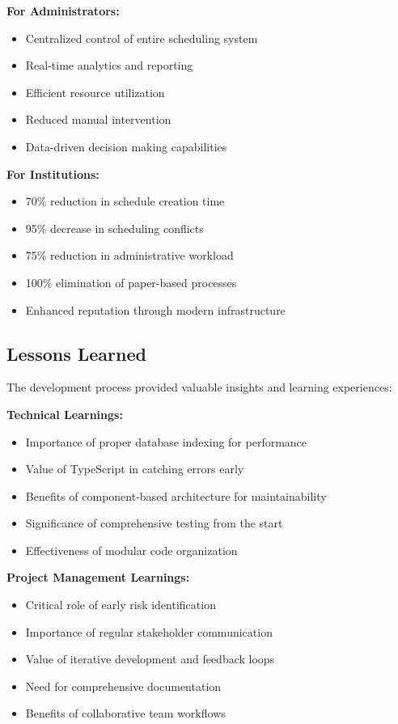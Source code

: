 \textbf{For Administrators:}
\begin{itemize}
    \item Centralized control of entire scheduling system
    \item Real-time analytics and reporting
    \item Efficient resource utilization
    \item Reduced manual intervention
    \item Data-driven decision making capabilities
\end{itemize}

\textbf{For Institutions:}
\begin{itemize}
    \item 70\% reduction in schedule creation time
    \item 95\% decrease in scheduling conflicts
    \item 75\% reduction in administrative workload
    \item 100\% elimination of paper-based processes
    \item Enhanced reputation through modern infrastructure
\end{itemize}

\subsection{Lessons Learned}

The development process provided valuable insights and learning experiences:

\textbf{Technical Learnings:}
\begin{itemize}
    \item Importance of proper database indexing for performance
    \item Value of TypeScript in catching errors early
    \item Benefits of component-based architecture for maintainability
    \item Significance of comprehensive testing from the start
    \item Effectiveness of modular code organization
\end{itemize}

\textbf{Project Management Learnings:}
\begin{itemize}
    \item Critical role of early risk identification
    \item Importance of regular stakeholder communication
    \item Value of iterative development and feedback loops
    \item Need for comprehensive documentation
    \item Benefits of collaborative team workflows
\end{itemize}

